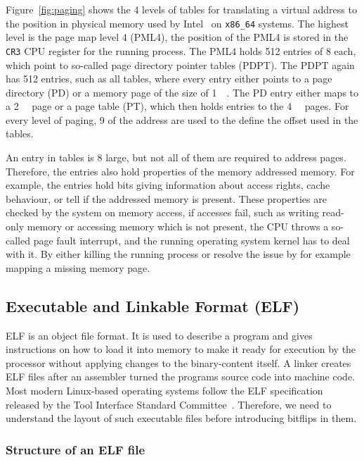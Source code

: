 Figure~\ref{fig:paging} shows the \num{4} levels of tables for translating a
virtual address to the position in physical memory used by Intel~\cite{intelsys}
on \texttt{x86\_64} systems. The highest level is the page map level 4 (PML4),
the position of the PML4 is stored in the \texttt{CR3} CPU register for the
running process. The PML4 holds \num{512} entries of \SI{8}{\byte} each, which
point to so-called page directory pointer tables (PDPT). The PDPT again has
\num{512} entries, such as all tables, where every entry either points to a page
directory (PD) or a memory page of the size of \SI{1}{\giga\byte}. The PD entry
either maps to a \SI{2}{\mega\byte} page or a page table (PT), which then holds
entries to the \SI{4}{\kilo\byte} pages. For every level of paging, \SI{9}{\bit}
of the address are used to the define the offset used in the tables.

An entry in tables is \SI{8}{\byte} large, but not all of them are required to
address pages. Therefore, the entries also hold properties of the memory
addressed memory. For example, the entries hold bits giving information about
access rights, cache behaviour, or tell if the addressed memory is present.
These properties are checked by the system on memory access, if accesses fail,
such as writing read-only memory or accessing memory which is not present, the
CPU throws a so-called page fault interrupt, and the running operating system
kernel has to deal with it. By either killing the running process or resolve the
issue by for example mapping a missing memory page.

\subsection{Executable and Linkable Format (ELF)}
\label{sec:elf}

ELF is an object file format. It is used to describe a program and gives
instructions on how to load it into memory to make it ready for execution
by the processor without applying changes to the binary-content itself. A
linker creates ELF files after an assembler turned the program\textquotesingle s
source code into machine code. Most modern Linux-based operating systems follow
the ELF specification released by the Tool Interface Standard
Committee~\cite{elfspec}. Therefore, we need to understand the layout of such
executable files before introducing bitflips in them.

\subsubsection{Structure of an ELF file}

